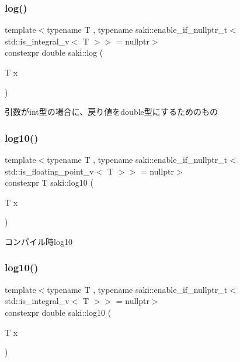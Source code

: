 \subsubsection{\texorpdfstring{log()}{log()}\hspace{0.1cm}{\footnotesize\ttfamily [2/2]}}
{\footnotesize\ttfamily template$<$typename T , typename saki\+::enable\+\_\+if\+\_\+nullptr\+\_\+t$<$ std\+::is\+\_\+integral\+\_\+v$<$ T $>$$>$  = nullptr$>$ \\
constexpr double saki\+::log (\begin{DoxyParamCaption}\item[{T}]{x }\end{DoxyParamCaption})}



引数がint型の場合に、戻り値をdouble型にするためのもの 

\mbox{\label{namespacesaki_aa1a5f3dfe15009e9e985b8b0647211e6}} 
\subsubsection{\texorpdfstring{log10()}{log10()}\hspace{0.1cm}{\footnotesize\ttfamily [1/2]}}
{\footnotesize\ttfamily template$<$typename T , typename saki\+::enable\+\_\+if\+\_\+nullptr\+\_\+t$<$ std\+::is\+\_\+floating\+\_\+point\+\_\+v$<$ T $>$$>$  = nullptr$>$ \\
constexpr T saki\+::log10 (\begin{DoxyParamCaption}\item[{T}]{x }\end{DoxyParamCaption})}



コンパイル時log10 

\mbox{\label{namespacesaki_a7e5fde452567de6eaae1d5c481497757}} 
\subsubsection{\texorpdfstring{log10()}{log10()}\hspace{0.1cm}{\footnotesize\ttfamily [2/2]}}
{\footnotesize\ttfamily template$<$typename T , typename saki\+::enable\+\_\+if\+\_\+nullptr\+\_\+t$<$ std\+::is\+\_\+integral\+\_\+v$<$ T $>$$>$  = nullptr$>$ \\
constexpr double saki\+::log10 (\begin{DoxyParamCaption}\item[{T}]{x }\end{DoxyParamCaption})}



